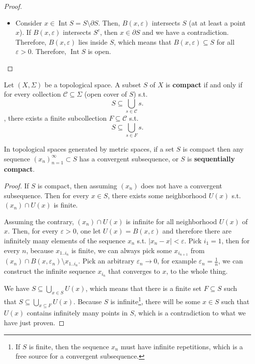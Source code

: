 \begin{proof}
\begin{itemize}
  \item Consider \( x \in \operatorname{Int} S = S \setminus \partial S \).
    Then, \( B(x, \varepsilon) \) intersects \( S \) (at at least a point \( x
    \)). If \( B(x, \varepsilon) \) intersects \( S^{c} \), then \( x \in
    \partial S \) and we have a contradiction. Therefore, \( B(x, \varepsilon)
    \) lies inside \( S \), which means that \( B(x, \varepsilon) \subseteq S \)
    for all \( \varepsilon > 0 \). Therefore, \( \operatorname{Int} S \) is
    open.
\end{itemize}
\end{proof}

\begin{definition}
  Let \( (X, \Sigma) \) be a topological space. A subset \( S \) of \( X \) is
  \textbf{compact} if and only if for every collection \( \mathcal{C} \subseteq
  \Sigma \) (open cover of \( S \)) s.t.\[
    S \subseteq  \bigcup_{s \in \mathcal{C}} s
  .\] , there exists a finite subcollection \( F
  \subseteq \mathcal{C} \) s.t. \[
    S \subseteq  \bigcup_{s \in F} s
  .\] 
\end{definition}

\begin{theorem}
  In topological spaces generated by metric spaces, if a set \( S \) is compact
  then any sequence \( (x_n)_{n=1}^{\infty} \subset S \) has a convergent
  subsequence, or \( S \) is \textbf{sequentially compact}.
\end{theorem}

\begin{proof}
  If \( S \) is compact, then assuming \( (x_{n}) \) does not have a convergent
  subsequence. Then for every \( x \in S \), there exists some neighborhood \(
  U(x) \) s.t. \( (x_{n}) \cap  U(x) \) is finite.

  Assuming the contrary, \( (x_{n}) \cap U(x) \) is infinite for all
  neighborhood \( U(x) \) of \( x \). Then, for every \( \varepsilon > 0 \), one
  let \( U(x) = B(x, \varepsilon) \) and therefore there are infinitely many
  elements of the sequence \( x_{n} \) s.t. \( |x_{n} - x| < \varepsilon \).
  Pick \( i_{1} = 1 \), then for every \( n \), because \( x_{1 .. i_{n}} \) is
  finite, we can always pick some \( x_{i_{n+1}} \) from \( (x_{n}) \cap  B(x,
  \varepsilon_{n}) \setminus x_{1 .. i_{n}} \). Pick an arbitrary \(
  \varepsilon_{n} \to 0 \), for example \( \varepsilon_{n} = \frac{1}{n} \), we
  can construct the infinite sequence \( x_{i_{n}} \) that converges to \( x \),
  to the whole thing.

  We have \( S \subseteq \bigcup_{x \in S} U(x) \), which means that there is a
  finite set \( F \subseteq S \) such that \( S \subseteq \bigcup_{x \subseteq
  F} U(x) \). Because \( S \) is infinite\footnote{If \( S \) is finite, then
  the sequence \( x_{n} \) must have infinite repetitions, which is a free
  source for a convergent subsequence.}, there will be some \( x \in S \) such
  that \( U(x) \) contains infinitely many points in \( S \), which is a
  contradiction to what we have just proven.
\end{proof}

